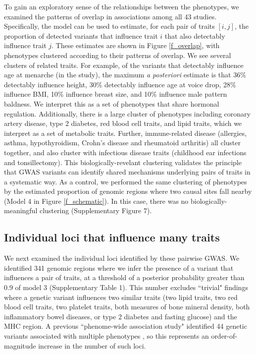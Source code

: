 \documentclass[11pt,titlepage]{article}
\begin{document}
To gain an exploratory sense of the relationships between the phenotypes, we examined the patterns of overlap in associations among all 43 studies. 
Specifically, the model can be used to estimate, for each pair of traits $[i,j]$, the proportion of detected variants that influence trait $i$ that also detectably influence trait $j$.
These estimates are shown in Figure \ref{f_overlap}, with phenotypes clustered according to their patterns of overlap. 
We see several clusters of related traits. 
For example, of the variants that detectably influence age at menarche (in the \citet{Perry:2014aa} study), the maximum \emph{a posteriori} estimate is that 36\% detectably influence height, 30\% detectably influence age at voice drop, 28\% influence BMI, 10\% influence breast size, and 10\% influence male pattern baldness. 
We interpret this as a set of phenotypes that share hormonal regulation. 
Additionally, there is a large cluster of phenotypes including coronary artery disease, type 2 diabetes, red blood cell traits, and lipid traits, which we interpret as a set of metabolic traits.
Further, immune-related disease (allergies, asthma, hypothyroidism, Crohn's disease and rheumatoid arthritis) all cluster together, and also cluster with infectious disease traits (childhood ear infections and tonsillectomy). 
This biologically-revelant clustering validates the principle that GWAS variants can identify shared mechanisms underlying pairs of traits in a systematic way.
As a control, we performed the same clustering of phenotypes by the estimated proportion of genomic regions where two causal sites fall nearby (Model 4 in Figure \ref{f_schematic}).
In this case, there was no biologically-meaningful clustering (Supplementary Figure 7).


\subsection{Individual loci that influence many traits}
We next examined the individual loci identified by these pairwise GWAS.
We identified 341 genomic regions where we infer the presence of a variant that influences a pair of traits, at a threshold of a posterior probability greater than 0.9 of model 3 (Supplementary Table 1). 
This number excludes ``trivial" findings where a genetic variant influences two similar traits (two lipid traits, two red blood cell traits, two platelet traits, both measures of bone mineral density, both inflammatory bowel diseases, or type 2 diabetes and fasting glucose) and the MHC region. 
A previous ``phenome-wide association study" identified 44 genetic variants associated with multiple phenotypes \citep{Denny:2013aa}, so this represents an order-of-magnitude increase in the number of such loci.
 
\end{document}
